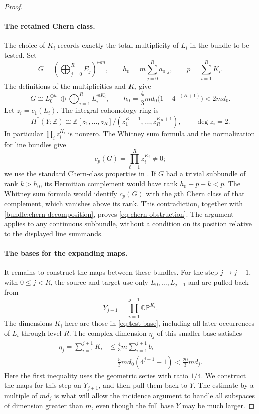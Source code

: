 \begin{proof}
\paragraph{The retained Chern class.}
The choice of $K_i$ records exactly the total multiplicity of $L_i$ in
the bundle to be tested.  Set
\[
 G=\left(\bigoplus_{j=0}^R E_j\right)^{\oplus m},\qquad
 h_0=m\sum_{j=0}^R a_{0,j},\qquad p=\sum_{i=1}^R K_i.
\]
The definitions of the multiplicities and $K_i$ give
\begin{equation}\label{bundle:chern-decomposition}
 G\cong L_0^{\oplus h_0}\oplus
             \bigoplus_{i=1}^R L_i^{\oplus K_i},\qquad
 h_0=\frac43md_0\bigl(1-4^{-(R+1)}\bigr)<2md_0.
\end{equation}
Let $z_i=c_1(L_i)$.  The integral cohomology ring is
\[
 H^*(Y;\mathbb Z)
 \cong\mathbb Z[z_1,\ldots,z_R]/
       (z_1^{K_1+1},\ldots,z_R^{K_R+1}),\qquad \deg z_i=2.
\]
In particular $\prod_i z_i^{K_i}$ is nonzero.  The Whitney sum formula
and the normalization for line bundles give
\[
 c_p(G)=\prod_{i=1}^R z_i^{K_i}\ne0;
\]
we use the standard Chern-class properties in
\cite[Theorem~3.2]{HatcherVB}.
If $G$ had a trivial subbundle of rank $k>h_0$, its Hermitian complement
would have rank $h_0+p-k<p$.  The Whitney sum formula would identify
$c_p(G)$ with the $p$th Chern class of that complement, which vanishes
above its rank.  This contradiction, together with
\eqref{bundle:chern-decomposition}, proves \eqref{eq:chern-obstruction}.
The argument applies to any continuous subbundle, without a condition
on its position relative to the displayed line summands.

\paragraph{The bases for the expanding maps.}
It remains to construct the maps between these bundles.  For the step
$j\to j+1$, with $0\leq j<R$, the source and target use only
$L_0,\ldots,L_{j+1}$ and are pulled back from
\[
 Y_{j+1}=\prod_{i=1}^{j+1}\mathbb{CP}^{K_i}.
\]
The dimensions $K_i$ here are those in \eqref{eq:test-base}, including
all later occurrences of $L_i$ through level $R$.  The complex dimension
$\eta_j$ of this smaller base satisfies
\begin{equation}\label{bundle:prefix-dimension}
 \begin{split}
 \eta_j=\sum_{i=1}^{j+1}K_i
 &\leq\frac43m\sum_{i=1}^{j+1}b_i\\
 &=\frac53md_0(4^{j+1}-1)
 <\frac{20}{3}md_j.
 \end{split}
\end{equation}
Here the first inequality uses the geometric series with ratio $1/4$.
We construct the maps for this step on $Y_{j+1}$, and then pull them back
to $Y$.  The estimate by a multiple of $md_j$ is what will allow the
incidence argument to handle all subspaces of dimension greater than
$m$, even though the full base $Y$ may be much larger.


\end{proof}
